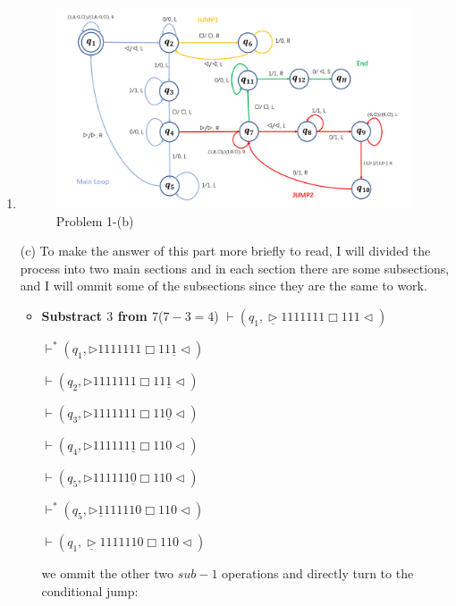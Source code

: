 \documentclass[12pt,a4paper]{article}
\makeatletter
\newtheorem*{solution}{Solution}
\theoremstyle{definition}
\renewenvironment{solution}[1][Solution] {\par\pushQED{\qed}\normalfont\topsep6\p@\@plus6\p@\relax\trivlist\item[\hskip\labelsep\bfseries#1\@addpunct{.}]\ignorespaces}{\popQED\endtrivlist\@endpefalse} \makeatother
\makeatother
\begin{document}
\begin{enumerate}
\begin{solution}
\begin{figure}
	\centering
	\includegraphics[scale=0.5]{TM.pdf}
    \caption{Problem 1-(b)}

\end{figure}



(c) To make the answer of this part more briefly to read, I will divided the process into two main sections and in each
section there are some subsections, and I will ommit some of the subsections since they are the same to work.

\begin{itemize}
	\item \textbf{Substract $3$ from $7$}($7 - 3 = 4$)  
	$\vdash (q_1,\underline{\triangleright}  1 1  1  1  1  1  1  \Box 1  1  1   \triangleleft)$

	$\vdash^{*} (q_1,\triangleright  1  1  1  1  1  1  1  \Box 1  1  \underline{1}   \triangleleft)$

	$\vdash (q_2,\triangleright  1  1  1  1  1  1  1  \Box 1  1  \underline{1}  \triangleleft)$

	$\vdash (q_3,\triangleright  1  1  1  1  1  1  1  \Box 1  1  \underline{0}  \triangleleft)$

	$\vdash (q_4,\triangleright  1  1  1  1  1  1  \underline{1}  \Box 1  1  0  \triangleleft)$
	
	$\vdash (q_5,\triangleright  1  1  1  1  1  1  \underline{0} \Box 1  1  0   \triangleleft)$

	$\vdash^{*} (q_5,\triangleright  \underline{1}  1  1  1  1  1 0 \Box 1  1  0   \triangleleft)$

	$\vdash (q_1,\underline{\triangleright}  1 1  1  1  1  1  0  \Box 1  1  0  \triangleleft)$

	we ommit the other two $sub-1$ operations and directly turn to the conditional jump:
	

\end{itemize}
\end{solution}
\end{enumerate}
\end{document}
